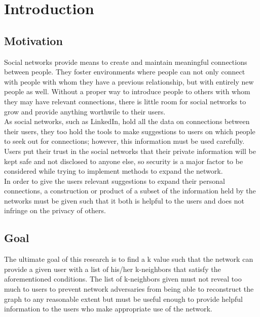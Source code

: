 \section{Introduction}


\subsection{Motivation} 


\indent Social networks provide means to create and maintain meaningful connections between people. They foster environments where people can not only connect with people with whom they have a previous relationship, but with entirely new people as well. Without a proper way to introduce people to others with whom they may have relevant connections, there is little room for social networks to grow and provide anything worthwile to their users. \\

\indent As social networks, such as LinkedIn, hold all the data on connections between their users, they too hold the tools to make suggestions to users on which people to seek out for connections; however, this information must be used carefully. Users put their trust in the social networks that their private information will be kept safe and not disclosed to anyone else, so security is a major factor to be considered while trying to implement methods to expand the network.  \\

\indent In order to give the users relevant suggestions to expand their personal connections, a construction or product of a subset of the information held by the networks must be given such that it both is helpful to the users and does not infringe on the  privacy of others. \\

\subsection{Goal}

\indent The ultimate goal of this research is to find a k value such that the network can provide a given user with a list of his/her k-neighbors that satisfy the aforementioned conditions. The list of k-neighbors given must not reveal too much to users to prevent network adversaries from being able to reconstruct the graph to any reasonable extent but must be useful enough to provide helpful information to the users who make appropriate use of the network. \\

